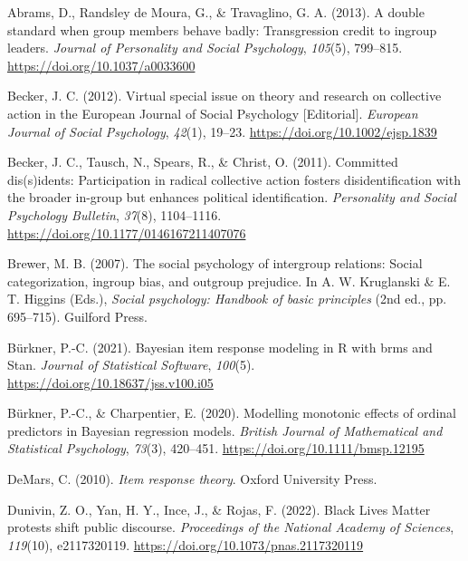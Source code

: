 \documentclass[twocolumn, 11pt, letterpaper]{article}
\newenvironment{CSLReferences}[2]{}{}
\begin{document}
\hypertarget{refs}{}
\begin{CSLReferences}{1}{0}
\leavevmode{}%
Abrams, D., Randsley de Moura, G., \& Travaglino, G. A. (2013). A double
standard when group members behave badly: {Transgression} credit to
ingroup leaders. \emph{Journal of Personality and Social Psychology},
\emph{105}(5), 799--815. \url{https://doi.org/10.1037/a0033600}

\leavevmode{}%
Becker, J. C. (2012). Virtual special issue on theory and research on
collective action in the {European} {Journal} of {Social} {Psychology}
{[}{Editorial}{]}. \emph{European Journal of Social Psychology},
\emph{42}(1), 19--23. \url{https://doi.org/10.1002/ejsp.1839}

\leavevmode{}%
Becker, J. C., Tausch, N., Spears, R., \& Christ, O. (2011). Committed
dis(s)idents: {Participation} in radical collective action fosters
disidentification with the broader in-group but enhances political
identification. \emph{Personality and Social Psychology Bulletin},
\emph{37}(8), 1104--1116. \url{https://doi.org/10.1177/0146167211407076}

\leavevmode{}%
Brewer, M. B. (2007). The social psychology of intergroup relations:
Social categorization, ingroup bias, and outgroup prejudice. In A. W.
Kruglanski \& E. T. Higgins (Eds.), \emph{Social psychology: Handbook of
basic principles} (2nd ed., pp. 695--715). Guilford Press.

\leavevmode{}%
Bürkner, P.-C. (2021). Bayesian item response modeling in {R} with brms
and {Stan}. \emph{Journal of Statistical Software}, \emph{100}(5).
\url{https://doi.org/10.18637/jss.v100.i05}

\leavevmode{}%
Bürkner, P.-C., \& Charpentier, E. (2020). Modelling monotonic effects
of ordinal predictors in {Bayesian} regression models. \emph{British
Journal of Mathematical and Statistical Psychology}, \emph{73}(3),
420--451. \url{https://doi.org/10.1111/bmsp.12195}

\leavevmode{}%
DeMars, C. (2010). \emph{Item response theory}. Oxford University Press.

\leavevmode{}%
Dunivin, Z. O., Yan, H. Y., Ince, J., \& Rojas, F. (2022). Black {Lives}
{Matter} protests shift public discourse. \emph{Proceedings of the
National Academy of Sciences}, \emph{119}(10), e2117320119.
\url{https://doi.org/10.1073/pnas.2117320119}


\end{CSLReferences}
\end{document}
